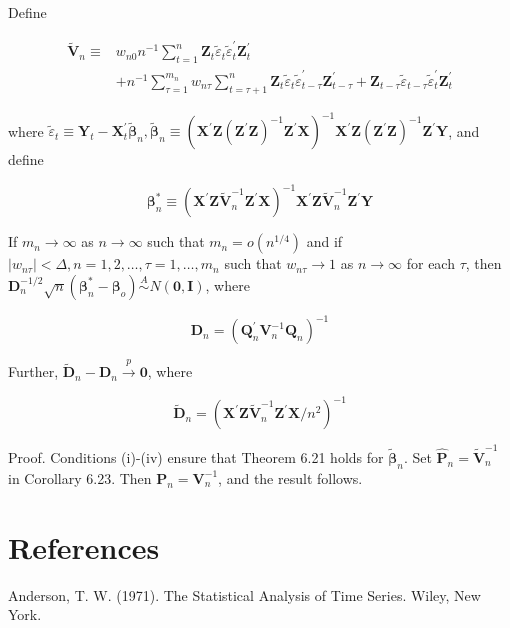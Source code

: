 \documentclass[10pt]{article}
\begin{document}
Define

$$
\begin{aligned}
\tilde{\mathbf{V}}_{n} \equiv & w_{n 0} n^{-1} \sum_{t=1}^{n} \mathbf{Z}_{t} \tilde{\varepsilon}_{t} \tilde{\varepsilon}_{t}^{\prime} \mathbf{Z}_{t}^{\prime} \\
& +n^{-1} \sum_{\tau=1}^{m_{n}} w_{n \tau} \sum_{t=\tau+1}^{n} \mathbf{Z}_{t} \tilde{\varepsilon}_{t} \tilde{\varepsilon}_{t-\tau}^{\prime} \mathbf{Z}_{t-\tau}^{\prime}+\mathbf{Z}_{t-\tau} \tilde{\varepsilon}_{t-\tau} \tilde{\varepsilon}_{t}^{\prime} \mathbf{Z}_{t}^{\prime}
\end{aligned}
$$

where $\tilde{\varepsilon}_{t} \equiv \mathbf{Y}_{t}-\mathbf{X}_{t}^{\prime} \tilde{\boldsymbol{\beta}}_{n}, \tilde{\boldsymbol{\beta}}_{n} \equiv\left(\mathbf{X}^{\prime} \mathbf{Z}\left(\mathbf{Z}^{\prime} \mathbf{Z}\right)^{-1} \mathbf{Z}^{\prime} \mathbf{X}\right)^{-1} \mathbf{X}^{\prime} \mathbf{Z}\left(\mathbf{Z}^{\prime} \mathbf{Z}\right)^{-1} \mathbf{Z}^{\prime} \mathbf{Y}$, and define

$$
\boldsymbol{\beta}_{n}^{*} \equiv\left(\mathbf{X}^{\prime} \mathbf{Z} \tilde{\mathbf{V}}_{n}^{-1} \mathbf{Z}^{\prime} \mathbf{X}\right)^{-1} \mathbf{X}^{\prime} \mathbf{Z} \tilde{\mathbf{V}}_{n}^{-1} \mathbf{Z}^{\prime} \mathbf{Y}
$$

If $m_{n} \rightarrow \infty$ as $n \rightarrow \infty$ such that $m_{n}=o\left(n^{1 / 4}\right)$ and if $\left|w_{n \tau}\right|<\Delta, n= 1,2, \ldots, \tau=1, \ldots, m_{n}$ such that $w_{n \tau} \rightarrow 1$ as $n \rightarrow \infty$ for each $\tau$, then $\mathbf{D}_{n}^{-1 / 2} \sqrt{n}\left(\boldsymbol{\beta}_{n}^{*}-\boldsymbol{\beta}_{o}\right) \stackrel{A}{\sim} N(\mathbf{0}, \mathbf{I})$, where

$$
\mathbf{D}_{n}=\left(\mathbf{Q}_{n}^{\prime} \mathbf{V}_{n}^{-1} \mathbf{Q}_{n}\right)^{-1}
$$

Further, $\tilde{\mathbf{D}}_{n}-\mathbf{D}_{n} \xrightarrow{p} \mathbf{0}$, where

$$
\tilde{\mathbf{D}}_{n}=\left(\mathbf{X}^{\prime} \mathbf{Z} \tilde{\mathbf{V}}_{n}^{-1} \mathbf{Z}^{\prime} \mathbf{X} / n^{2}\right)^{-1}
$$

Proof. Conditions (i)-(iv) ensure that Theorem 6.21 holds for $\tilde{\boldsymbol{\beta}}_{n}$. Set $\hat{\mathbf{P}}_{n}=\tilde{\mathbf{V}}_{n}^{-1}$ in Corollary 6.23. Then $\mathbf{P}_{n}=\mathbf{V}_{n}^{-1}$, and the result follows.

\section*{References}
Anderson, T. W. (1971). The Statistical Analysis of Time Series. Wiley, New York.
\end{document}

